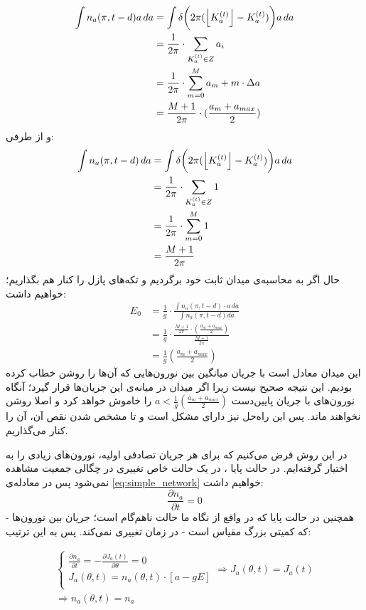 \begin{align}
	\int n_a(\pi,t-d)a\,da &= \int \delta \bigg( 2\pi ( \left\lfloor K^{(t)}_a \right\rfloor - K^{(t)}_a) \bigg) a\,da\\
	&= \frac{1}{2\pi} \cdot \sum_{K^{(t)}_a \in Z} a_i \\
	&= \frac{1}{2\pi} \cdot \sum^{M}_{m=0} a_m + m \cdot \Delta a\\
	&= \frac{M+1}{2\pi} \cdot ( \frac{a_m +a_{max} }{2} )\\
\end{align}
و از طرفی:
\begin{align}
	\int n_a(\pi,t-d)\,da &= \int \delta \bigg( 2\pi ( \left\lfloor K^{(t)}_a \right\rfloor - K^{(t)}_a) \bigg) a\,da\\
	&= \frac{1}{2\pi} \cdot \sum_{K^{(t)}_a \in Z} 1 \\
	&= \frac{1}{2\pi} \cdot \sum^{M}_{m=0}  1\\
	&= \frac{M+1}{2\pi}
\end{align}
حال اگر به محاسبه‌ی میدان ثابت خود برگردیم و تکه‌های پازل را کنار هم بگذاریم؛ خواهیم داشت:
\begin{align}
	E_0 &= \frac{1}{g}\cdot \frac{\int n_a(\pi,t-d)\cdot a\,da}{\int n_a(\pi,t-d) da } \\
	&= \frac{1}{g}\cdot \frac{ \frac{M+1}{2\pi} \cdot ( \frac{a_m +a_{max} }{2} ) }{ \frac{M+1}{2\pi} } \\
	&= \frac{1}{g} ( \frac{a_m +a_{max} }{2} )
\end{align}
این میدان معادل است با جریان میانگین بین نورون‌هایی که آن‌ها را روشن خطاب کرده بودیم. این نتیجه صحیح نیست زیرا اگر میدان در میانه‌ی این جریان‌ها قرار گیرد؛ آنگاه نورون‌های با جریان پایین‌دست 
$a < \frac{1}{g} ( \frac{a_m +a_{max} }{2} ) $
را خاموش خواهد کرد و اصلا روشن نخواهند ماند. پس این راه‌حل نیز دارای مشکل است و تا مشخص شدن نقص آن، آن را کنار می‌گذاریم.

در این روش فرض می‌کنیم که برای هر جریان تصادفی اولیه، نورون‌های زیادی را به اختیار گرفته‌ایم. در حالت پایا  ، در یک حالت خاص تغییری در چگالی جمعیت مشاهده نمی‌شود پس در معادله‌ی
\ref{eq:simple_network}
خواهیم داشت:
\begin{equation}
	\frac{\partial n_a}{\partial t} = 0
\end{equation}
همچنین در حالت پایا که در واقع از نگاه ما حالت ناهم‌گام است؛ جریان بین نورون‌ها - که کمیتی بزرگ مقیاس است -  در زمان تغییری نمی‌کند. پس به این ترتیب:

\begin{align}
	\begin{cases}
		\frac{\partial n_a}{\partial t} = - \frac{\partial J_{a}(t)}{\partial \theta} = 0\\
		J_{a}(\theta, t) = n_a(\theta,t) \cdot [ a - g E ]\\
	\end{cases}
	\Rightarrow J_{a}(\theta, t) = J_{a}(t)\\
	\Rightarrow n_{a}(\theta, t) = n_{a}\\
\end{align}

